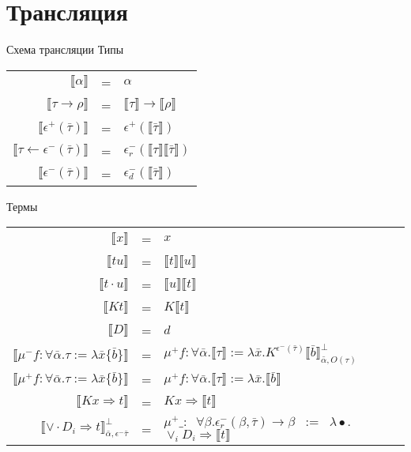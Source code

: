\documentclass[10pt, mathserif]{beamer}
\let\\\tabularnewline
\let\\\tabularnewline
\newcommand{\sem}[1]{\llbracket #1\rrbracket}
\newcommand{\graybox}[1]{\colorbox{light-gray}{#1}}
\theoremstyle{definition}
\begin{document}
\section{Трансляция}

\begin{frame}[fragile]{Схема трансляции}
% 
Типы
\begin{tabular}{r c l}
  $\sem{\alpha}$ & = & $\alpha$ \\
  $\sem{\tau \to \rho}$ & = & $\sem{\tau}\to\sem{\rho}$ \\
  $\sem{\epsilon^+(\bar{\tau})}$ & = & $\epsilon^+(\sem{\bar{\tau}})$ \\
  $\sem{\tau \leftarrow \epsilon^-(\bar{\tau})}$ & = & $\epsilon_r^-(\sem{\tau}\sem{\bar{\tau}})$ \\
  $\sem{\epsilon^-(\bar{\tau})}$ & = & $\epsilon^-_d (\sem{\bar{\tau}})$ \\
\end{tabular}

\vspace{1cm}

Термы
\begin{tabular}{r c l}
$\sem{x}$        & = & $x$ \\
$\sem{tu}$       & = & $\sem{t}\sem{u}$ \\
$\sem{t\cdot u}$ & = & \graybox{$\sem{u}\sem{t}$} \\
$\sem{Kt}$       & = & $K\sem{t}$ \\
$\sem{D}$        & = & \graybox{$d$} \\
$\sem{\mu^- f:\forall \bar{\alpha}.\tau := \lambda \bar{x}\{\bar{b}\}}$ &=& 
  $\mu^+ f:\forall \bar{\alpha}.\sem{\tau} := \lambda \bar{x}.K^{\epsilon^-(\bar{\tau})}\sem{\bar{b}}^\bot_{\bar{\alpha},O(\tau)}$ \\
$\sem{\mu^+ f:\forall \bar{\alpha}.\tau := \lambda \bar{x}\{\bar{b}\}}$ &=& 
  $\mu^+ f:\forall \bar{\alpha}.\sem{\tau} := \lambda \bar{x}.\sem{\bar{b}}$ \\
$\sem{K x \Rightarrow t}$       & = & $K x \Rightarrow\sem{t}$ \\

$\sem{\vee \cdot D_i \Rightarrow t}^\bot_{\bar{\alpha},\epsilon^-{\bar{\tau}}}$       & = & 
  $\mu^+\_:\;\;\forall \beta.\epsilon^-_r(\beta,\bar{\tau})\to \beta \;\;:= \;\;\lambda \bullet .$ \graybox{$\vee_i D_i \Rightarrow \sem{t}$} \\

\end{tabular}
\end{frame}
\end{document}

